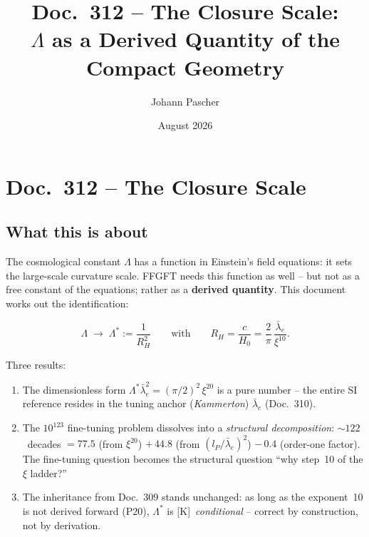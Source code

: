 \documentclass[11pt]{report}
\title{Doc.~312 -- The Closure Scale:\\
$\Lambda$ as a Derived Quantity of the Compact Geometry}
\author{Johann Pascher}
\date{August 2026}
\begin{document}
\maketitle
\tableofcontents

\chapter*{Doc.~312 -- The Closure Scale}

\section*{What this is about}

The cosmological constant $\Lambda$ has a function in Einstein's
field equations: it sets the large-scale curvature scale. FFGFT needs
this function as well -- but not as a free constant of the equations;
rather as a \textbf{derived quantity}. This document works out the
identification:

\[
  \Lambda \;\longrightarrow\; \Lambda^{*} := \frac{1}{R_H^2}
  \qquad\text{with}\qquad
  R_H = \frac{c}{H_0} = \frac{2}{\pi}\,\frac{\bar\lambda_e}{\xi^{10}}.
\]

Three results:
\begin{enumerate}
  \item The dimensionless form
        $\Lambda^{*}\bar\lambda_e^{2} = (\pi/2)^{2}\,\xi^{20}$
        is a pure number -- the entire SI reference resides in the
        tuning anchor (\emph{Kammerton}) $\bar\lambda_e$ (Doc.~310).
  \item The $10^{123}$ fine-tuning problem dissolves into a
        \emph{structural decomposition}: $\sim\!122$~decades
        $= 77.5$ (from $\xi^{20}$) $+\,44.8$ (from
        $(l_P/\bar\lambda_e)^2$) $-\,0.4$ (order-one factor). The
        fine-tuning question becomes the structural question
        \enquote{why step~10 of the $\xi$ ladder?}
  \item The inheritance from Doc.~309 stands unchanged: as long as
        the exponent~10 is not derived forward (P20), $\Lambda^{*}$
        is [K]~\emph{conditional} -- correct by construction, not by
        derivation.
\end{enumerate}
\end{document}
